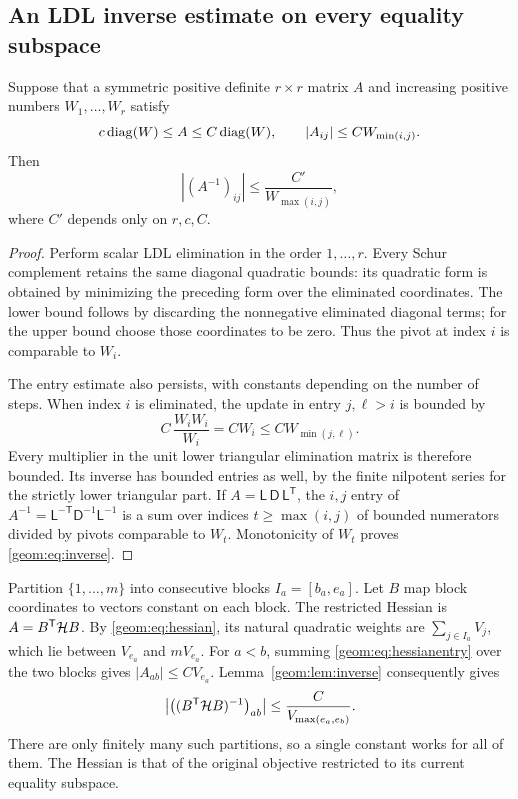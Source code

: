 \subsection{An LDL inverse estimate on every equality subspace}

\begin{lemma}\label{geom:lem:inverse}
Suppose that a symmetric positive definite \(r\times r\) matrix \(A\)
and increasing positive numbers \(W_1,\ldots,W_r\) satisfy
\[
 c\operatorname{diag}(W)\le A\le C\operatorname{diag}(W),\qquad
 |A_{ij}|\le C W_{\min(i,j)}.
\]
Then
\begin{equation}
 |(A^{-1})_{ij}|\le\frac{C'}{W_{\max(i,j)}},       \label{geom:eq:inverse}
\end{equation}
where \(C'\) depends only on \(r,c,C\).
\end{lemma}

\begin{proof}
Perform scalar LDL elimination in the order \(1,\ldots,r\).
Every Schur complement retains the same diagonal quadratic bounds:
its quadratic form is obtained by minimizing the preceding form over
the eliminated coordinates.  The lower bound follows by discarding
the nonnegative eliminated diagonal terms; for the upper bound choose
those coordinates to be zero.  Thus the pivot at index \(i\) is
comparable to \(W_i\).

The entry estimate also persists, with constants depending on the
number of steps.  When index \(i\) is eliminated, the update in entry
\(j,\ell>i\) is bounded by
\[
 C\,\frac{W_iW_i}{W_i}=CW_i
       \le CW_{\min(j,\ell)}.
\]
Every multiplier in the unit lower triangular elimination matrix is
therefore bounded.  Its inverse has bounded entries as well, by the
finite nilpotent series for the strictly lower triangular part.
If \(A=\mathsf L\,\mathsf D\,\mathsf L^{\mathsf T}\), the \(i,j\) entry
of \(A^{-1}=\mathsf L^{-\mathsf T}\mathsf D^{-1}\mathsf L^{-1}\)
is a sum over indices \(t\ge\max(i,j)\) of bounded numerators divided
by pivots comparable to \(W_t\).  Monotonicity of \(W_t\) proves
\eqref{geom:eq:inverse}.
\end{proof}

Partition \(\{1,\ldots,m\}\) into consecutive blocks \(I_a=[b_a,e_a]\).
Let \(B\) map block coordinates to vectors constant on each block.
The restricted Hessian is \(A=B^{\mathsf T}\mathcal H B\).
By \eqref{geom:eq:hessian}, its natural quadratic weights are
\(\sum_{j\in I_a}V_j\), which lie between \(V_{e_a}\) and \(mV_{e_a}\).
For \(a<b\), summing \eqref{geom:eq:hessianentry} over the two blocks gives
\(|A_{ab}|\le C V_{e_a}\).  Lemma~\ref{geom:lem:inverse} consequently gives
\begin{equation}
 \left|\bigl((B^{\mathsf T}\mathcal H B)^{-1}\bigr)_{ab}\right|
       \le \frac C{V_{\max(e_a,e_b)}}.            \label{geom:eq:restrictedinverse}
\end{equation}
There are only finitely many such partitions, so a single constant
works for all of them.  The Hessian is that of the original objective
restricted to its current equality subspace.


